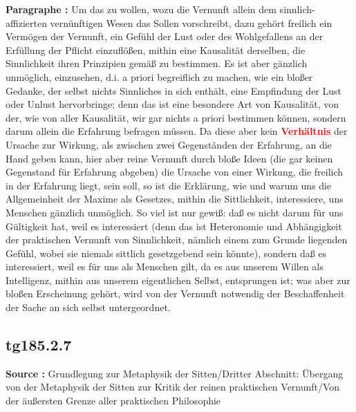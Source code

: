 \documentclass[a4paper,12pt,twoside]{book}
\newcommand{\match}[1]{\textcolor{red}{\textbf{#1}}}
\begin{document}
	\noindent\textbf{Paragraphe : }Um das zu wollen, wozu die Vernunft allein dem sinnlich-affizierten vernünftigen Wesen das Sollen vorschreibt, dazu gehört freilich ein Vermögen der Vernunft, ein Gefühl der Lust oder des Wohlgefallens an der Erfüllung der Pflicht einzuflößen, mithin eine Kausalität derselben, die Sinnlichkeit ihren Prinzipien gemäß zu bestimmen. Es ist aber gänzlich unmöglich, einzusehen, d.i. a priori begreiflich zu machen, wie ein bloßer Gedanke, der selbst nichts Sinnliches in sich enthält, eine Empfindung der Lust oder Unlust hervorbringe; denn das ist eine besondere Art von Kausalität, von der, wie von aller Kausalität, wir gar nichts a priori bestimmen können, sondern darum allein die Erfahrung befragen müssen. Da diese aber kein \match{Verhältnis} der Ursache zur Wirkung, als zwischen zwei Gegenständen der Erfahrung, an die Hand geben kann, hier aber reine Vernunft durch bloße Ideen (die gar keinen Gegenstand für Erfahrung abgeben) die Ursache von einer Wirkung, die freilich in der Erfahrung liegt, sein soll, so ist die Erklärung, wie und warum uns die Allgemeinheit der Maxime als Gesetzes, mithin die Sittlichkeit, interessiere, uns Menschen gänzlich unmöglich. So viel ist nur gewiß: daß es nicht darum für uns Gültigkeit hat, weil es interessiert (denn das ist Heteronomie und Abhängigkeit der praktischen Vernunft von Sinnlichkeit, nämlich einem zum Grunde liegenden Gefühl, wobei sie niemals sittlich gesetzgebend sein könnte), sondern daß es interessiert, weil es für uns als Menschen gilt, da es aus unserem Willen als Intelligenz, mithin aus unserem eigentlichen Selbst, entsprungen ist; was aber zur bloßen Erscheinung gehört, wird von der Vernunft notwendig der Beschaffenheit der Sache an sich selbst untergeordnet.
	
	
	\subsection*{tg185.2.7} 
	\textbf{Source : }Grundlegung zur Metaphysik der Sitten/Dritter Abschnitt: Übergang von der Metaphysik der Sitten zur Kritik der reinen praktischen Vernunft/Von der äußersten Grenze aller praktischen Philosophie\\  
	
\end{document}
